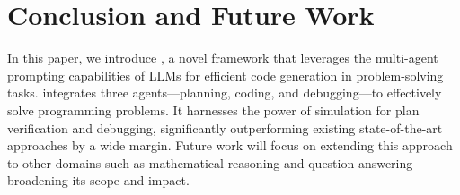 \section{Conclusion and Future Work}
\begin{nobreakwords}
In this paper, we introduce \toolnospace, a novel framework that leverages the multi-agent prompting capabilities of LLMs for efficient code generation in problem-solving tasks. \tool integrates three agents—planning, coding, and debugging—to effectively solve programming problems. It harnesses the power of simulation for plan verification and debugging, significantly outperforming existing state-of-the-art approaches by a wide margin. Future work will focus on extending this approach to other domains such as mathematical reasoning and question answering broadening its scope and impact.
\end{nobreakwords}
